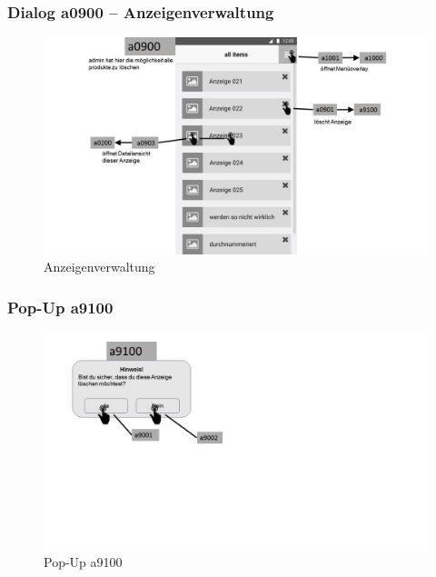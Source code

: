 \documentclass[a4paper,12pt,oneside]{scrartcl}
\begin{document}
\subsubsection{Dialog a0900 – Anzeigenverwaltung}
\begin{figure}[!htbp]
\centering
\noindent\includegraphics[width=\linewidth,height=\textheight,keepaspectratio]{Dialoge/a0900}
\caption{Anzeigenverwaltung}
\end{figure}
\FloatBarrier

\subsubsection{Pop-Up a9100}
\begin{figure}[!htbp]
\centering
\noindent\includegraphics[width=\linewidth,height=\textheight,keepaspectratio]{Dialoge/a9100}
\caption{Pop-Up a9100}
\end{figure}
\FloatBarrier
\end{document}
